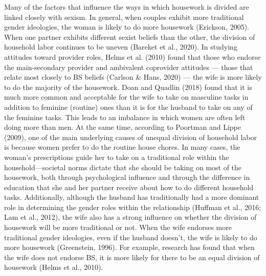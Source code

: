 \documentclass[
  english,
  man]{apa6}
\begin{document}
Many of the factors that influence the ways in which housework is divided are linked closely with sexism. In general, when couples exhibit more traditional gender ideologies, the woman is likely to do more housework (Erickson, 2005). When one partner exhibits different sexist beliefs than the other, the division of household labor continues to be uneven (Bareket et al., 2020). In studying attitudes toward provider roles, Helms et al. (2010) found that those who endorse the main-secondary provider and ambivalent coprovider attitudes --- those that relate most closely to BS beliefs (Carlson \& Hans, 2020) --- the wife is more likely to do the majority of the housework. Doan and Quadlin (2018) found that it is much more common and acceptable for the wife to take on masculine tasks in addition to feminine (routine) ones than it is for the husband to take on any of the feminine tasks. This leads to an imbalance in which women are often left doing more than men. At the same time, according to Poortman and Lippe (2009), one of the main underlying causes of unequal division of household labor is because women prefer to do the routine house chores. In many cases, the woman's prescriptions guide her to take on a traditional role within the household---societal norms dictate that she should be taking on most of the housework, both through psychological influence and through the difference in education that she and her partner receive about how to do different household tasks. Additionally, although the husband has traditionally had a more dominant role in determining the gender roles within the relationship (Huffman et al., 2016; Lam et al., 2012), the wife also has a strong influence on whether the division of housework will be more traditional or not. When the wife endorses more traditional gender ideologies, even if the husband doesn't, the wife is likely to do more housework (Greenstein, 1996). For example, research has found that when the wife does not endorse BS, it is more likely for there to be an equal division of housework (Helms et al., 2010).
\end{document}

